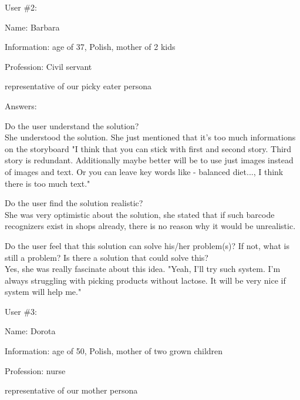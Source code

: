 \documentclass[a4paper,10pt,oneside]{scrreprt}
\begin{document}
User \#2:
\begin{compactitem}
	\item Name: Barbara
	\item Information: age of 37, Polish, mother of 2 kids
	\item Profession: Civil servant
	\item representative of our picky eater persona
\end{compactitem}
\bigskip

Answers:
\begin{compactitem}
	\item Do the user understand the solution?\\
	She understood the solution. She just mentioned that it's too much informations on the storyboard "I think that you can stick with first and second story. Third story is redundant. Additionally maybe better will be to use just images instead of images and text. Or you can leave key words like - balanced diet..., I think there is too much text."
\\
	
	\item Do the user find the solution realistic?\\
	She was very optimistic about the solution, she stated that if such barcode recognizers exist in shops already, there is no reason why it would be unrealistic.\\
	
	\item Do the user feel that this solution can solve his/her problem(s)? If not, what is still
	a problem? Is there a solution that could solve this?\\
	Yes, she was really fascinate about this idea. "Yeah, I'll try such system. I'm always struggling with picking products without lactose. It will be very nice if system will help me."\\
\end{compactitem}
\bigskip

User \#3:
\begin{compactitem}
	\item Name: Dorota
	\item Information: age of 50, Polish, mother of two grown children
	\item Profession: nurse
	\item representative of our mother persona
\end{compactitem}
\bigskip
\end{document}
